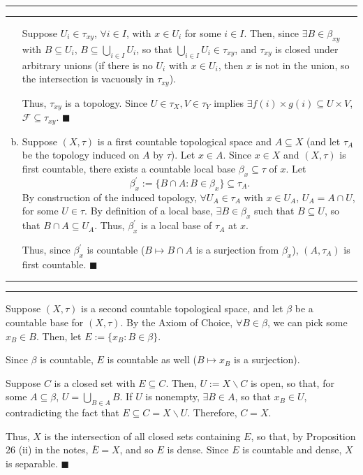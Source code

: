 \documentclass[11pt]{article}
\newcounter{questionCounter}
\newcounter{partCounter}[questionCounter]
\newenvironment{question}[2][\arabic{questionCounter}]{%
    \setcounter{partCounter}{0}%
    \vspace{.25in} \hrule \vspace{0.5em}%
        \noindent{\bf #2}%
    \vspace{0.8em} \hrule \vspace{.10in}%
    \addtocounter{questionCounter}{1}%
}{}
\renewcommand{\qed}{\quad $\blacksquare$}
\newcommand{\sminus}{\backslash}
\begin{document}
\begin{question}{Problem 1}
\begin{enumerate}[(a)]
Suppose $U_i \in \tau_{xy}$, $\forall i \in I$, with $x \in U_i$ for some
$i \in I$. Then, since $\exists B \in \beta_{xy}$ with $B \subseteq U_i$,
$B \subseteq \bigcup_{i \in I} U_i$, so that
$\bigcup_{i \in I} U_i \in \tau_{xy}$, and $\tau_{xy}$ is closed under
arbitrary unions (if there is no $U_i$ with $x \in U_i$, then $x$ is not in
the union, so the intersection is vacuously in $\tau_{xy}$).

Thus, $\tau_{xy}$ is a topology. Since $U \in \tau_X, V \in \tau_Y$
implies $\exists f(i) \times g(i) \subseteq U \times V$,
$\mathcal{F} \subseteq \tau_{xy}$. \qed

\item Suppose $(X,\tau)$ is a first countable topological space and
$A \subseteq X$ (and let $\tau_A$ be the topology induced on $A$ by $\tau$).
Let $x \in A$. Since $x \in X$ and $(X,\tau)$ is first countable, there exists
a countable local base $\beta_x \subseteq \tau$ of $x$. Let
\[\beta^{\prime}_x := \{B \cap A : B \in \beta_x\} \subseteq \tau_A.\]
By construction of the induced topology, $\forall U_A \in \tau_A$ with
$x \in U_A$, $U_A = A \cap U$, for some $U \in \tau$. By definition of a local
base, $\exists B \in \beta_x$ such that $B \subseteq U$, so that
$B \cap A \subseteq U_A$. Thus, $\beta_x^{\prime}$ is a local base of
$\tau_A$ at $x$.

Thus, since $\beta_x^{\prime}$ is countable ($B \mapsto B \cap A$ is a
surjection from $\beta_x$), $(A,\tau_A)$ is first countable. \qed
\end{enumerate}
\end{question}

\begin{question}{Problem 2}
Suppose $(X,\tau)$ is a second countable topological space, and let
$\beta$ be a countable base for $(X,\tau)$. By the Axiom of Choice,
$\forall B \in \beta$, we can pick some $x_B \in B$. Then, let
$E := \{x_B : B \in \beta\}$.

Since $\beta$ is countable, $E$ is countable as well ($B \mapsto x_B$ is a
surjection).

Suppose $C$ is a closed set with $E \subseteq C$. Then, $U := X \sminus C$ is
open, so that, for some $A \subseteq \beta$, $U = \bigcup_{B \in A} B$. If $U$
is nonempty, $\exists B \in A$, so that $x_B \in U$, contradicting the fact
that $E \subseteq C = X \sminus U$. Therefore, $C = X$.

Thus, $X$ is the intersection of all closed sets containing $E$, so that, by
Proposition 26 (ii) in the notes, $\overline{E} = X$, and so $E$ is dense.
Since $E$ is countable and dense, $X$ is separable. \qed
\end{question}
\end{document}
